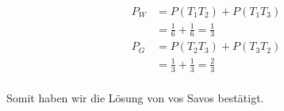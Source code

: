 \begin{equation}
    \begin{split}
        P_W & = P(T_1T_2) + P(T_1T_3) \\
        & = \frac{1}{6} + \frac{1}{6} = \frac{1}{3} \\
        P_G & = P(T_2T_3) + P(T_3T_2) \\
        &= \frac{1}{3} + \frac{1}{3} = \frac{2}{3} \\
    \end{split}
\end{equation}

Somit haben wir die Lösung von vos Savos bestätigt.


